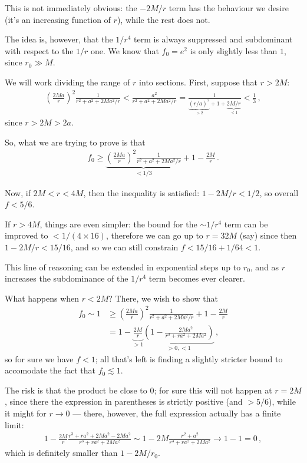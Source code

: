 \documentclass[main.tex]{subfiles}
\begin{document}
This is not immediately obvious: the \(-2M/r\) term has the behaviour we desire (it's an increasing function of \(r\)), while the rest does not.

The idea is, however, that the \(1/r^4\) term is always suppressed and subdominant with respect to the \(1/r\) one. 
We know that \(f_0 = e^2\) is only slightly less than \(1\), since \(r_0 \gg M\). 

We will work dividing the range of \(r\) into sections.
First, suppose that \(r > 2M\):
%
\begin{align}
\left(\frac{2Ma}{r}\right)^2 \frac{1}{r^2 + a^2 + 2Ma^2 /r} < 
\frac{a^2}{r^2 + a^2 + 2Ma^2 /r} = 
\frac{1}{\underbrace{(r/a)^2}_{>2} + 1 + \underbrace{2M/r}_{<1}} < \frac{1}{3}
\,,
\end{align}
%
since \(r > 2M > 2a\). 

So, what we are trying to prove is that 
%
\begin{align}
f_0 \geq \underbrace{\left(\frac{2Ma}{r}\right)^2 \frac{1}{r^2 + a^2 + 2Ma^2 /r}}_{< 1/3} + 1 - \frac{2M}{r}
\,.
\end{align}

Now, if \(2M < r < 4M\), then the inequality is satisfied: \(1 - 2M/r < 1/2\), so overall \(f < 5/6\). 

If \(r > 4M\), things are even simpler: the bound for the \(\sim 1/ r^4\) term can be improved to \(< 1/(4 \times 16)\), therefore we can go up to \(r = 32M\) (say) since then \(1 - 2M/r < 15/16\), and so we can still constrain \(f < 15/16 + 1/64 < 1\). 

This line of reasoning can be extended in exponential steps up to \(r_0\), and as \(r\) increases the subdominance of the \(1/r^4 \) term becomes ever clearer.

What happens when \(r < 2M\)? There, we wish to show that 
%
\begin{align}
f_0 \sim 1 &\geq \left(\frac{2Ma}{r}\right)^2 \frac{1}{r^2 + a^2 + 2Ma^2 /r} + 1 - \frac{2M}{r}  \\
&= 1 - \underbrace{\frac{2M}{r}}_{> 1} \underbrace{\left( 1 - \frac{2Ma^2}{r^3 + ra^2 + 2Ma^2}\right)}_{>0, < 1}
\,,
\end{align}
%
so for sure we have \(f < 1\); all that's left is finding a slightly stricter bound to accomodate the fact that \(f_0 \lesssim 1\).

The risk is that the product be close to 0; for sure this will not happen at \(r = 2M\), since there the expression in parentheses is strictly positive (and \(>5/6\)), while it might for \(r \to 0\) --- there, however, the full expression actually has a finite limit: 
%
\begin{align}
1- \frac{2M}{r} \frac{r^3 + r a^2 + 2Ma^2 - 2Ma^2}{r^3+ r a^2 + 2Ma^2} 
\sim 1 - 2M \frac{r^2 + a^2}{r^3 + ra^2 + 2Ma^2} \to 1 - 1 = 0
\,,
\end{align}
%
which is definitely smaller than \(1 - 2M/r_0 \).
\end{document}

